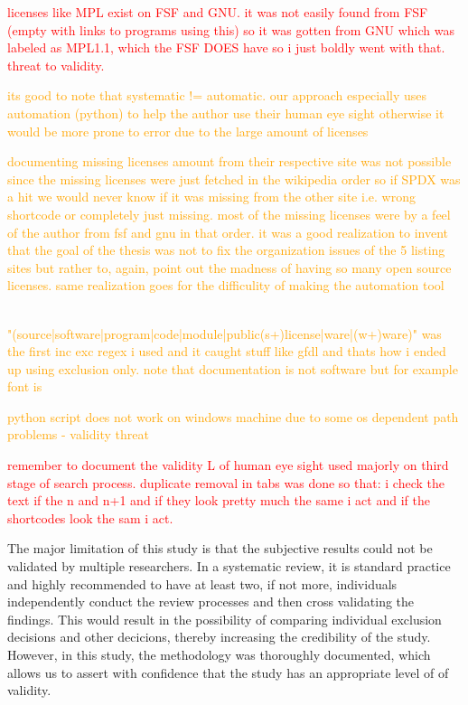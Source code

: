 \textcolor{red}{licenses like MPL exist on FSF and GNU. it was not easily found from FSF (empty with links to programs using this) so it was gotten from GNU which was labeled as MPL1.1, which the FSF DOES have so i just boldly went with that. threat to validity.}

\textcolor{orange}{its good to note that systematic != automatic. our approach especially uses automation (python) to help the author use their human eye sight otherwise it would be more prone to error due to the large amount of licenses}

\textcolor{orange}{documenting missing licenses amount from their respective site was not possible since the missing licenses were just fetched in the wikipedia order so if SPDX was a hit we would never know if it was missing from the other site i.e. wrong shortcode or completely just missing. most of the missing licenses were by a feel of the author from fsf and gnu in that order. it was a good realization to invent that the goal of the thesis was not to fix the organization issues of the 5 listing sites but rather to, again, point out the madness of having so many open source licenses. same realization goes for the difficulity of making the automation tool}

\textcolor{orange}{\\"(source|software|program|code|module|public(s+)license|ware|(w+)ware)" was the first inc exc regex i used and it caught stuff like gfdl and thats how i ended up using exclusion only. note that documentation is not software but for example font is}

\textcolor{orange}{python script does not work on windows machine due to some os dependent path problems - validity threat}

\textcolor{red}{remember to document the validity L of human eye sight used majorly on third stage of search process. duplicate removal in tabs was done so that: i check the text if the n and n+1 and if they look pretty much the same i act and if the shortcodes look the sam i act.}

The major limitation of this study is that the subjective results could not be validated by multiple researchers. In a systematic review, it is standard practice and highly recommended to have at least two, if not more, individuals independently conduct the review processes and then cross validating the findings. This would result in the possibility of comparing individual exclusion decisions and other decicions, thereby increasing the credibility of the study. However, in this study, the methodology was thoroughly documented, which allows us to assert with confidence that the study has an appropriate level of of validity.

